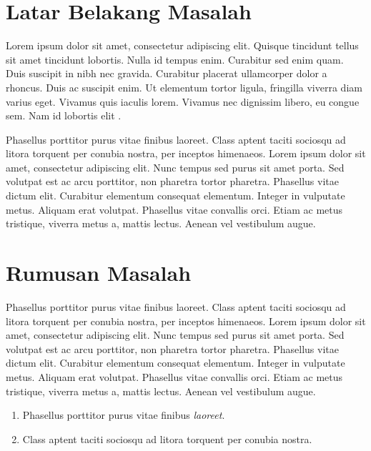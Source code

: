 
\section{Latar Belakang Masalah}

Lorem ipsum dolor sit amet, consectetur adipiscing elit. Quisque
tincidunt tellus sit amet tincidunt lobortis. Nulla id tempus
enim. Curabitur sed enim quam. Duis suscipit in nibh nec
gravida. Curabitur placerat ullamcorper dolor a rhoncus. Duis ac
suscipit enim. Ut elementum tortor ligula, fringilla viverra diam
varius eget. Vivamus quis iaculis lorem. Vivamus nec dignissim libero,
eu congue sem. Nam id lobortis elit \parencite{foster}.

Phasellus porttitor purus \citet{warn} vitae finibus laoreet. Class
aptent taciti sociosqu ad litora torquent per conubia nostra, per
inceptos himenaeos. Lorem ipsum dolor sit amet, consectetur adipiscing
elit. Nunc tempus sed purus sit amet porta. Sed volutpat est ac arcu
porttitor, non pharetra tortor pharetra. Phasellus vitae dictum
elit. Curabitur elementum consequat elementum. Integer in vulputate
metus. Aliquam erat volutpat. Phasellus vitae convallis orci. Etiam ac
metus tristique, viverra metus a, mattis lectus. Aenean vel vestibulum
augue.

\section{Rumusan Masalah}

Phasellus porttitor purus vitae finibus laoreet. Class aptent taciti
sociosqu ad litora torquent per conubia nostra, per inceptos
himenaeos. Lorem ipsum dolor sit amet, consectetur adipiscing
elit. Nunc tempus sed purus sit amet porta. Sed volutpat est ac arcu
porttitor, non pharetra tortor pharetra. Phasellus vitae dictum
elit. Curabitur elementum consequat elementum. Integer in vulputate
metus. Aliquam erat volutpat. Phasellus vitae convallis orci. Etiam ac
metus tristique, viverra metus a, mattis lectus. Aenean vel vestibulum
augue.

\begin{enumerate}
\item  Phasellus porttitor purus vitae finibus \emph{laoreet}.
\item Class aptent taciti sociosqu ad litora torquent per conubia nostra.
\end{enumerate}


